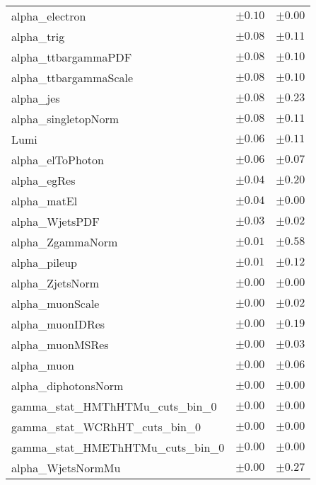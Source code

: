 \begin{table}
\begin{center}
\begin{tabular*}{\textwidth}{@{\extracolsep{\fill}}lcc}
alpha\_electron         & $\pm 0.10$          & $\pm 0.00$       \\
alpha\_trig         & $\pm 0.08$          & $\pm 0.11$       \\
alpha\_ttbargammaPDF         & $\pm 0.08$          & $\pm 0.10$       \\
alpha\_ttbargammaScale         & $\pm 0.08$          & $\pm 0.10$       \\
alpha\_jes         & $\pm 0.08$          & $\pm 0.23$       \\
alpha\_singletopNorm         & $\pm 0.08$          & $\pm 0.11$       \\
Lumi         & $\pm 0.06$          & $\pm 0.11$       \\
alpha\_elToPhoton         & $\pm 0.06$          & $\pm 0.07$       \\
alpha\_egRes         & $\pm 0.04$          & $\pm 0.20$       \\
alpha\_matEl         & $\pm 0.04$          & $\pm 0.00$       \\
alpha\_WjetsPDF         & $\pm 0.03$          & $\pm 0.02$       \\
alpha\_ZgammaNorm         & $\pm 0.01$          & $\pm 0.58$       \\
alpha\_pileup         & $\pm 0.01$          & $\pm 0.12$       \\
alpha\_ZjetsNorm         & $\pm 0.00$          & $\pm 0.00$       \\
alpha\_muonScale         & $\pm 0.00$          & $\pm 0.02$       \\
alpha\_muonIDRes         & $\pm 0.00$          & $\pm 0.19$       \\
alpha\_muonMSRes         & $\pm 0.00$          & $\pm 0.03$       \\
alpha\_muon         & $\pm 0.00$          & $\pm 0.06$       \\
alpha\_diphotonsNorm         & $\pm 0.00$          & $\pm 0.00$       \\
gamma\_stat\_HMThHTMu\_cuts\_bin\_0         & $\pm 0.00$          & $\pm 0.00$       \\
gamma\_stat\_WCRhHT\_cuts\_bin\_0         & $\pm 0.00$          & $\pm 0.00$       \\
gamma\_stat\_HMEThHTMu\_cuts\_bin\_0         & $\pm 0.00$          & $\pm 0.00$       \\
alpha\_WjetsNormMu         & $\pm 0.00$          & $\pm 0.27$       \\

\end{tabular*}
\end{center}
\end{table}
